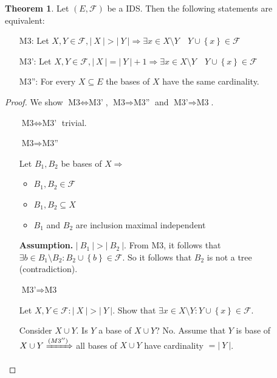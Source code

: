 \documentclass[a4paper]{article}
\theoremstyle{definition}
\newtheorem{theorem}{Theorem}
\newcommand{\card}[1]{\left|\:\!#1\:\!\right|}
\newcommand{\set}[1]{\left\{#1\right\}}
\begin{document}
\begin{theorem}
  \label{satz-6.2}
  Let $(E, \mathcal{F})$ be a IDS. Then the following statements are equivalent:
  \begin{itemize}
    \item[M3:] Let $X, Y \in \mathcal{F}, \card{X} > \card{Y} \Rightarrow \exists x \in X \setminus Y \quad Y \cup \set{x} \in \mathcal{F}$
    \item[M3':] Let $X, Y \in \mathcal{F}, \card{X} = \card{Y} + 1 \Rightarrow \exists x \in X \setminus Y \quad Y \cup \set{x} \in \mathcal{F}$
    \item[M3'':] For every $X \subseteq E$ the bases of $X$ have the same cardinality.
  \end{itemize}
\end{theorem}

\begin{proof}
  We show $\text{M3} \Leftrightarrow \text{M3'}$, $\text{M3} \Rightarrow \text{M3''}$ and $\text{M3'} \Rightarrow \text{M3}$.

  \begin{itemize}
    \item[$\text{M3} \Leftrightarrow \text{M3'}$] trivial.
    \item[$\text{M3} \Rightarrow \text{M3''}$]

      Let $B_1, B_2$ be bases of $X \Rightarrow$
      \begin{itemize}
        \item $B_1, B_2 \in \mathcal{F}$
        \item $B_1, B_2 \subseteq X$
        \item $B_1$ and $B_2$ are inclusion maximal independent
      \end{itemize}

      \textbf{Assumption.} $\card{B_1} > \card{B_2}$.
      From M3, it follows that $\exists b \in B_1 \setminus B_2: B_2 \cup \set{b} \in \mathcal{F}$.
      So it follows that $B_2$ is not a tree (contradiction).

  \item[$\text{M3'} \Rightarrow \text{M3}$]

    Let $X, Y \in \mathcal{F}: \card{X} > \card{Y}$. Show that $\exists x \in X \setminus Y: Y \cup \set{x} \in \mathcal{F}$.

    Consider $X \cup Y$. Is $Y$ a base of $X \cup Y$? No.
    Assume that $Y$ is base of $X \cup Y \xRightarrow{(M3'')}$ all bases of $X \cup Y$ have cardinality $= \card{Y}$.


\end{itemize}
\end{proof}
\end{document}
